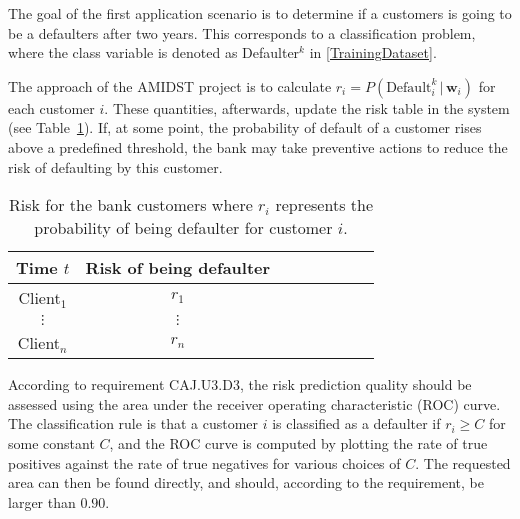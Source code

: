 \documentclass{article}
\theoremstyle{theorem}
\theoremstyle{definition}
\newcommand{\w}{\mathbf{w}}
\begin{document}
The goal of the first application scenario is to determine if a customers is going to be a defaulters after two years. This corresponds to a classification problem, where the class variable is denoted as Defaulter$^k$ in \ref{TrainingDataset}. 

The approach of the AMIDST project is to calculate $r_i=P(\mbox{Default}_i^k \,|\, \w_i)$ for each customer $i$. These quantities, afterwards, update the risk table in the system (see Table~\ref{tab:riskTable}).
If, at some point, the probability of default of a customer rises above a predefined threshold, the bank may take preventive actions to reduce the risk of defaulting by this customer.

\begin{table}[ht!]
\centering
\begin{tabular}{c|ccc|ccc|c}
     Time $t$  & Risk of being defaulter \\  
\hline
Client$_1$  &    $r_1$  \\ 
$\vdots$      &   $\vdots$   \\ 
Client$_n$  &   $r_n$  \\ 
\end{tabular} 
\caption{Risk for the bank customers where $r_i$ represents the probability of being defaulter for customer $i$.}
\label{tab:riskTable}
\end{table}



According to requirement CAJ.U3.D3, the risk prediction quality should be assessed using the area under the receiver operating characteristic (ROC) curve. 
The classification rule is that a customer $i$ is classified as a defaulter if $r_i \geq C$ for some constant $C$, and the ROC curve is computed by  plotting the rate of true positives against the rate of true negatives for various choices of $C$.  The requested area can then be found directly, and should, according to the requirement, be larger than $0.90$. 
\end{document}
